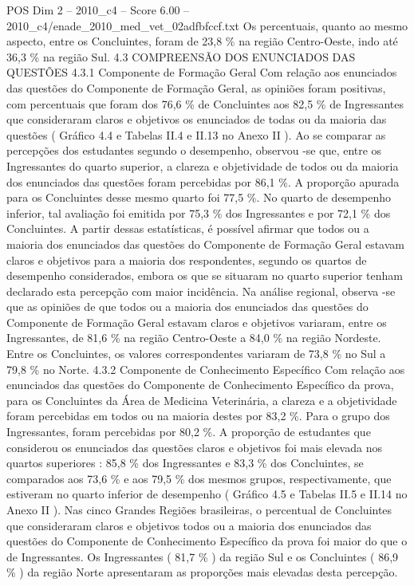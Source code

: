 \begin{textsample}{POS Dim 2 – 2010\_c4 – Score 6.00 – 2010\_c4/enade\_2010\_med\_vet\_02adfbfccf.txt}
Os percentuais, quanto ao mesmo aspecto, entre os Concluintes, foram de 23,8 \% na região Centro-Oeste, indo até 36,3 \% na região Sul. 4.3 COMPREENSÃO DOS ENUNCIADOS DAS QUESTÕES 4.3.1 Componente de Formação Geral Com relação aos enunciados das questões do Componente de Formação Geral, as opiniões foram positivas, com percentuais que foram dos 76,6 \% de Concluintes aos 82,5 \% de Ingressantes que consideraram claros e objetivos os enunciados de todas ou da maioria das questões ( Gráfico 4.4 e Tabelas II.4 e II.13 no Anexo II ).
Ao se comparar as percepções dos estudantes segundo o desempenho, observou -se que, entre os Ingressantes do quarto superior, a clareza e objetividade de todos ou da maioria dos enunciados das questões foram percebidas por 86,1 \%.
A proporção apurada para os Concluintes desse mesmo quarto foi 77,5 \%.
No quarto de desempenho inferior, tal avaliação foi emitida por 75,3 \% dos Ingressantes e por 72,1 \% dos Concluintes.
A partir dessas estatísticas, é possível afirmar que todos ou a maioria dos enunciados das questões do Componente de Formação Geral estavam claros e objetivos para a maioria dos respondentes, segundo os quartos de desempenho considerados, embora os que se situaram no quarto superior tenham declarado esta percepção com maior incidência.
Na análise regional, observa -se que as opiniões de que todos ou a maioria dos enunciados das questões do Componente de Formação Geral estavam claros e objetivos variaram, entre os Ingressantes, de 81,6 \% na região Centro-Oeste a 84,0 \% na região Nordeste.
Entre os Concluintes, os valores correspondentes variaram de 73,8 \% no Sul a 79,8 \% no Norte. 4.3.2 Componente de Conhecimento Específico Com relação aos enunciados das questões do Componente de Conhecimento Específico da prova, para os Concluintes da Área de Medicina Veterinária, a clareza e a objetividade foram percebidas em todos ou na maioria destes por 83,2 \%.
Para o grupo dos Ingressantes, foram percebidas por 80,2 \%.
A proporção de estudantes que considerou os enunciados das questões claros e objetivos foi mais elevada nos quartos superiores : 85,8 \% dos Ingressantes e 83,3 \% dos Concluintes, se comparados aos 73,6 \% e aos 79,5 \% dos mesmos grupos, respectivamente, que estiveram no quarto inferior de desempenho ( Gráfico 4.5 e Tabelas II.5 e II.14 no Anexo II ).
Nas cinco Grandes Regiões brasileiras, o percentual de Concluintes que consideraram claros e objetivos todos ou a maioria dos enunciados das questões do Componente de Conhecimento Específico da prova foi maior do que o de Ingressantes.
Os Ingressantes ( 81,7 \% ) da região Sul e os Concluintes ( 86,9 \% ) da região Norte apresentaram as proporções mais elevadas desta percepção.

\end{textsample}
